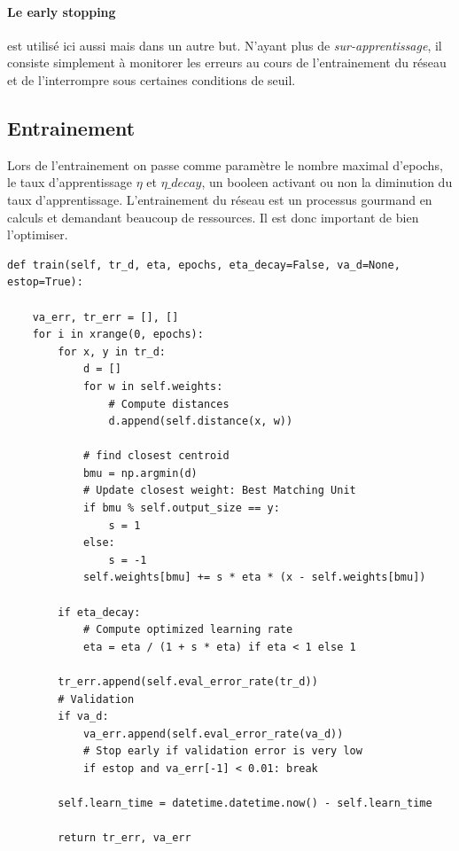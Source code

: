 \documentclass[11pt]{article}
\begin{document}
\paragraph{Le early stopping} est utilis\'e ici aussi mais dans un autre but.
N'ayant plus de {\em sur-apprentissage}, il consiste simplement \`a monitorer
les erreurs au cours de l'entrainement du r\'eseau et
de l'interrompre sous certaines conditions de seuil.

\newpage
\subsection{Entrainement}
Lors de l'entrainement on passe comme param\`etre le nombre maximal d'epochs,
le taux d'apprentissage $\eta$ et $\eta\_decay$, un booleen activant ou non la
diminution du taux d'apprentissage.
L'entrainement du r\'eseau est un processus gourmand en calculs et demandant
beaucoup de ressources. Il est donc important de bien l'optimiser.



\begin{lstlisting}
def train(self, tr_d, eta, epochs, eta_decay=False, va_d=None, estop=True):
	
	va_err, tr_err = [], []
	for i in xrange(0, epochs):
		for x, y in tr_d:
		    d = []
		    for w in self.weights:
		        # Compute distances
		        d.append(self.distance(x, w))

		    # find closest centroid
		    bmu = np.argmin(d)
		    # Update closest weight: Best Matching Unit
		    if bmu % self.output_size == y: 
		    	s = 1
		    else: 
		    	s = -1
		    self.weights[bmu] += s * eta * (x - self.weights[bmu])
		    
		if eta_decay:
            # Compute optimized learning rate
            eta = eta / (1 + s * eta) if eta < 1 else 1
            
        tr_err.append(self.eval_error_rate(tr_d))
        # Validation
        if va_d:
            va_err.append(self.eval_error_rate(va_d))
            # Stop early if validation error is very low
            if estop and va_err[-1] < 0.01: break

        self.learn_time = datetime.datetime.now() - self.learn_time
        
        return tr_err, va_err
\end{lstlisting}
\end{document}
